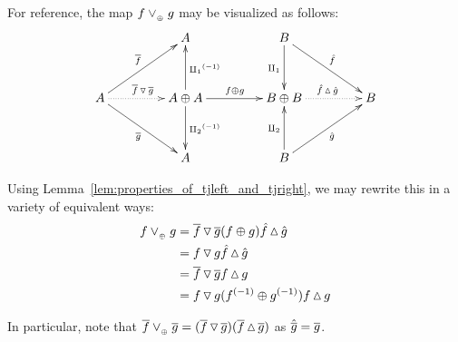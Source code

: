 For reference, the map $f \vee_{{_{\oplus}}} g$ may be visualized as follows:
\[
  \xymatrix@C+20pt @R+10pt{
    &A
      & B  \ar[dr]^{\rg{f}} \ar[d]_{\cpa}\\
    A \ar[ur]^{\rst{f}} \ar@{.>}[r]^{\rst{f}\tjleft \rst{g}} \ar[dr]_{\rst{g}}
      & A\+A \ar[u]_{\icpa} \ar[d]^{\icpb}
        \ar[r]^{f\+g}
       &B\+B \ar@{.>}[r]^{\rg{f}\tjright\rg{g}} & B\\
    & A & B\ar[ur]_{\rg{g}} \ar[u]^{\cpb}
  }
\]

Using Lemma~\ref{lem:properties_of_tjleft_and_tjright}, we may rewrite this in a variety of
equivalent ways:
\begin{align*}
  f \vee_{{_{\oplus}}} g &= \overline{f}\operatorname{\triangledown}\overline{g} (f\oplus g) \hat{f}\operatorname{\vartriangle}\hat{g} \\
  &= f \operatorname{\triangledown} g \hat{f}\operatorname{\vartriangle}\hat{g}\\
  & = \overline{f}\operatorname{\triangledown}\overline{g}  f\operatorname{\vartriangle} g\\
  & = f \operatorname{\triangledown} g ({f}^{(-1)}\oplus{g}^{(-1)})f\operatorname{\vartriangle} g
\end{align*}

In particular, note that $\overline{f}\vee_{{_{\oplus}}} \overline{g} = (\overline{f} \operatorname{\triangledown} \overline{g})
(\overline{f}\operatorname{\vartriangle}\overline{g})$ as $\hat{\overline{g}} = \overline{g}$.

